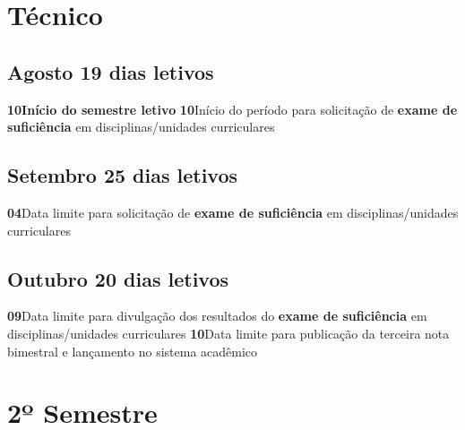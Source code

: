 \documentclass[thesis]{hmcposter}
\begin{document}
\begin{poster}
\section{\color{hmcorange}Técnico}\subsection{Agosto \hfill 19 dias letivos}\textbf{10}\qquad \textbf{Início do semestre letivo} \newline \textbf{10}\qquad Início do período para solicitação de \textbf{exame de suficiência} em disciplinas/unidades curriculares \subsection{Setembro \hfill 25 dias letivos}\textbf{04}\qquad Data limite para solicitação de \textbf{exame de suficiência} em disciplinas/unidades curriculares \subsection{Outubro \hfill 20 dias letivos}\textbf{09}\qquad Data limite para divulgação dos resultados do \textbf{exame de suficiência} em disciplinas/unidades curriculares \newline \textbf{10}\qquad Data limite para publicação da terceira nota bimestral e lançamento no sistema acadêmico  \vfill\null
\columnbreak
\section{\hfill \color{hmcorange}2º Semestre}

\end{poster}
\end{document}
